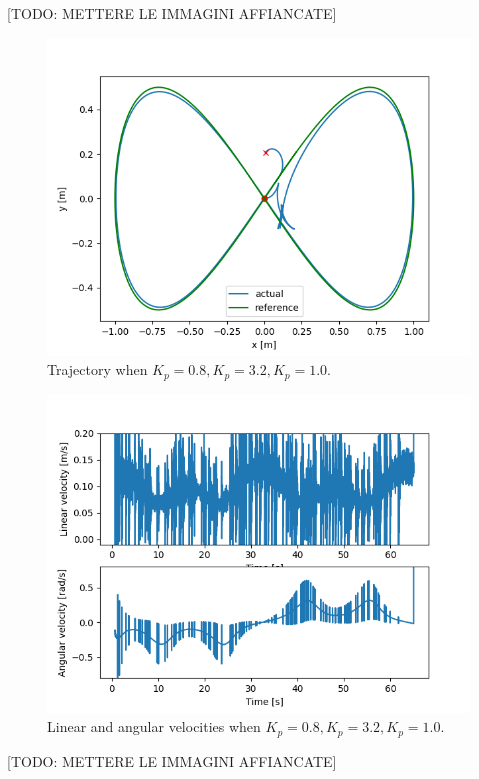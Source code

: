 \documentclass[11pt,a4paper]{article}
\begin{document}
[TODO: METTERE LE IMMAGINI AFFIANCATE]

\begin{figure}[H]
    \centering
    \includegraphics[scale=0.4]{different_params/custom_ki32kd10/Trajectory.png}
    \caption{Trajectory when $K_p=0.8, K_p=3.2, K_p=1.0$.}
\end{figure}

\begin{figure}[H]
    \centering
    \includegraphics[scale=0.4]{different_params/custom_ki32kd10/Linear_and_Angular_Velocities.png}
    \caption{Linear and angular velocities when $K_p=0.8, K_p=3.2, K_p=1.0$.}
\end{figure}

[TODO: METTERE LE IMMAGINI AFFIANCATE]
\end{document}
